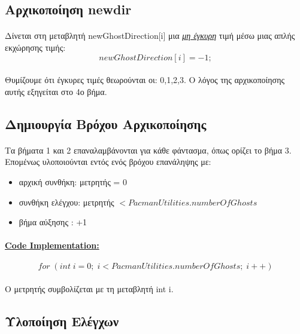 \documentclass[12pt,a4paper]{article}
\newcommand{\lt}{\latintext}
\newcommand{\gt}{\greektext}
\begin{document}
	\subsection{Αρχικοποίηση \lt newdir}
\paragraph*{}	Δίνεται στη μεταβλητή {\lt newGhostDirection[i]} μια \underline{\emph{μη έγκυρη}} τιμή μέσω μιας απλής εκχώρησης τιμής:
	\begin{equation*}
	newGhostDirection[i] = -1;
	\end{equation*}
\paragraph*{}	Θυμίζουμε ότι έγκυρες τιμές θεωρούνται οι: 0,1,2,3. Ο λόγος της αρχικοποίησης αυτής εξηγείται στο 4ο βήμα.
	
	\subsection{Δημιουργία Βρόχου Αρχικοποίησης}
\paragraph*{}	Τα βήματα 1 και 2 επαναλαμβάνονται για κάθε φάντασμα, όπως ορίζει το βήμα 3. Επομένως υλοποιούνται εντός ενός βρόχου επανάληψης με:
	\begin{itemize}
		\item 	αρχική συνθήκη: μετρητής = 0
		\item 	συνθήκη ελέγχου: μετρητής \lt $< PacmanUtilities.numberOfGhosts$
		\item 	\gt βήμα αύξησης : +1
	\end{itemize}
			\paragraph{\underline{\lt Code Implementation:}}
			
			\begin{equation*}
			for \; (int \; i=0; \;i<PacmanUtilities.numberOfGhosts; \;i++)
\end{equation*}
\paragraph*{}Ο μετρητής συμβολίζεται με τη μεταβλητή \lt int i. \gt
	
	
	\subsection{Υλοποίηση Ελέγχων}
\end{document}
